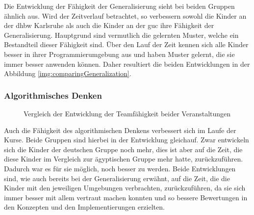 Die Entwicklung der Fähigkeit der Generalisierung sieht bei beiden Gruppen ähnlich aus. Wird der Zeitverlauf betrachtet, so verbessern sowohl die Kinder an der \acrshort{dhbw} Karlsruhe als auch die Kinder an der \acrshort{guc} ihre Fähigkeit der Generalisierung. Hauptgrund sind vermutlich die gelernten Muster, welche ein Bestandteil dieser Fähigkeit sind. Über den Lauf der Zeit kennen sich alle Kinder besser in ihrer Programmierumgebung aus und haben Muster gelernt, die sie immer besser anwenden können. Daher resultiert die beiden Entwicklungen in der Abbildung \ref{img:comparingGeneralization}.

\subsubsection{Algorithmisches Denken}
\begin{figure}[H]
	\centering
	\caption[Vergleich Entwicklung Teamfähigkeit beider Veranstaltungen]{Vergleich der Entwicklung der Teamfähigkeit beider Veranstaltungen}
\end{figure}

Auch die Fähigkeit des algorithmischen Denkens verbessert sich im Laufe der Kurse. Beide Gruppen sind hierbei in der Entwicklung gleichauf. Zwar entwickeln sich die Kinder der deutschen Gruppe noch mehr, dies ist aber auf die Zeit, die diese Kinder im Vergleich zur ägyptischen Gruppe mehr hatte, zurückzuführen. Dadurch war es für sie möglich, noch besser zu werden. Beide Entwicklungen sind, wie auch bereits bei der Generalisierung erwähnt, auf die Zeit, die die Kinder mit den jeweiligen Umgebungen verbrachten, zurückzuführen, da sie sich immer besser mit allem vertraut machen konnten und so bessere Bewertungen in den Konzepten und den Implementierungen erzielten. 

